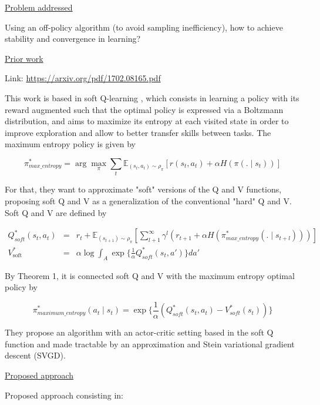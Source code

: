 \documentclass[12pt, english]{article}
\begin{document}
\underline{Problem addressed}

Using an off-policy algorithm (to avoid sampling inefficiency), how to achieve stability and convergence in learning?

\underline{Prior work}

Link: \url{https://arxiv.org/pdf/1702.08165.pdf}

This work is based in soft Q-learning \cite{haarnoja_reinforcement_2017}, which consists in learning a policy with its reward augmented such that the optimal policy is expressed via a Boltzmann distribution, and aims to maximize its entropy at each visited state in order to improve exploration and allow to better transfer skills between tasks. The maximum entropy policy is given by

\begin{equation}
  \pi^*_{max\_entropy} = \arg\max_\pi \sum_t \mathbb{E}_{(s_t, a_t) \sim \rho_\pi} [r(s_t, a_t) + \alpha H (\pi(. \mid s_t))]
\end{equation}

For that, they want to approximate "soft" versions of the Q and V functions, proposing soft Q and V as a generalization of the conventional "hard" Q and V. Soft Q and V are defined by

\begin{eqnarray}
  Q_{soft}^* (s_t, a_t) &=& r_t + \mathbb{E}_{(s_{t+1}) \sim \rho_\pi} [\sum_{l+1}^\infty \gamma^l (r_{t+1} + \alpha H(\pi_{max\_entropy}^* (. \mid s_{t+l})))] \\
  V^*_{\text{soft}} &=& \alpha \log \int_A \exp \{\frac{1}{\alpha} Q_{soft}^* (s_t, a')\} da'
\end{eqnarray}

By Theorem 1, it is connected soft Q and V with the maximum entropy optimal policy by

\begin{equation}
  \pi^*_{maximum\_entropy}(a_t \mid s_t) = \exp\{\frac{1}{\alpha} (Q_{soft}^* (s_t, a_t) - V_{soft}^* (s_t))\}
\end{equation}

They propose an algorithm with an actor-critic setting based in the soft Q function and made tractable by an approximation and Stein variational gradient descent (SVGD).

\underline{Proposed approach}

Proposed approach consisting in:
\end{document}
